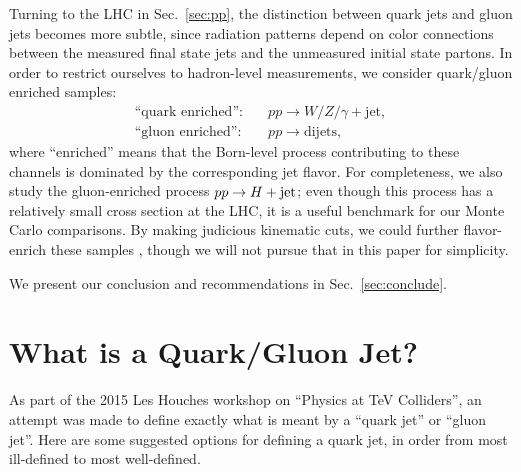 \documentclass[11pt,letterpaper]{article}
\DeclareRobustCommand{\Sec}[1]{Sec.~\ref{#1}}
\begin{document}
Turning to the LHC in \Sec{sec:pp}, the distinction between quark jets and gluon jets becomes more subtle, since radiation patterns depend on color connections between the measured final state jets and the unmeasured initial state partons.  In order to restrict ourselves to hadron-level measurements, we consider quark/gluon enriched samples:
\begin{align}
\text{``quark enriched''}: \quad & pp \to W/Z/\gamma + \text{jet}, \\
\text{``gluon enriched''}: \quad & pp \to \text{dijets},
\end{align}
where ``enriched'' means that the Born-level process contributing to these channels is dominated by the corresponding jet flavor.  For completeness, we also study the gluon-enriched process $pp \to H + \rm{jet}$; even though this process has a relatively small cross section at the LHC, it is a useful benchmark for our Monte Carlo comparisons.  By making judicious kinematic cuts, we could further flavor-enrich these samples \cite{}, though we will not pursue that in this paper for simplicity.

We present our conclusion and recommendations in \Sec{sec:conclude}.

\section{What is a Quark/Gluon Jet?}
\label{sec:quarkgluondef}

As part of the 2015 Les Houches workshop on ``Physics at TeV Colliders'', an attempt was made to define exactly what is meant by a ``quark jet'' or ``gluon jet''.  Here are some suggested options for defining a quark jet, in order from most ill-defined to most well-defined.
\end{document}
